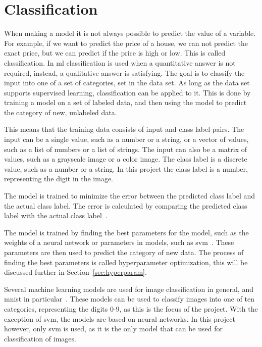 \section{Classification}\label{sec:classification}
When making a model it is not always possible to predict the value of a variable. For example, if we want to predict the price of a house, we can not predict the exact price, but we can predict if the price is high or low. This is called classification. In \gls{ml} classification is used when a quantitative answer is not required, instead, a qualitative answer is satisfying. The goal is to classify the input into one of a set of categories, set in the data set. As long as the data set supports supervised learning, classification can be applied to it. 
This is done by training a model on a set of labeled data, and then using the model to predict the category of new, unlabeled data. 

This means that the training data consists of input and class label pairs. The input can be a single value, such as a number or a string, or a vector of values, such as a list of numbers or a list of strings. The input can also be a matrix of values, such as a grayscale image or a color image. The class label is a discrete value, such as a number or a string. In this project the class label is a number, representing the digit in the image. 

The model is trained to minimize the error between the predicted class label and the actual class label. The error is calculated by comparing the predicted class label with the actual class label~\cite{james-statistical-learning}. 

The model is trained by finding the best parameters for the model, such as the weights of a neural network or parameters in models, such as \gls{svm}~\cite{james-statistical-learning}. These parameters are then used to predict the category of new data. The process of finding the best parameters is called hyperparameter optimization, this will be discussed further in Section~\ref{sec:hyperparam}.

Several machine learning models are used for image classification in general, and \gls{mnist} in particular~\cite{lecun-mnist-database,IBM-computer-vision,convolutional-neural-networks-convnets,multi-column-neural-network-ciregan}. These models can be used to classify images into one of ten categories, representing the digits 0-9, as this is the focus of the project. With the exception of \gls{svm}, the models are based on neural networks. In this project however, only \gls{svm} is used, as it is the only model that can be used for classification of images.  

